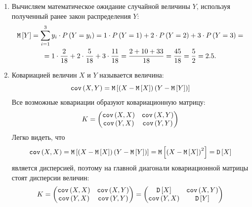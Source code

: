 \begin{enumerate}
    \item Вычисляем математическое ожидание случайной величины $Y$, используя полученный ранее закон распределения $Y$:
    \begin{multline}
        \mathtt{M} \left [ Y \right ] = \sum_{i=1}^3 y_i \cdot P \left ( Y=y_i \right )
        = 1 \cdot P \left ( Y=1 \right ) + 2 \cdot P \left ( Y=2 \right ) + 3 \cdot P \left ( Y=3 \right ) = \\
        = 1 \cdot \frac{2}{18} + 2 \cdot \frac{5}{18} + 3 \cdot \frac{11}{18}
        = \frac{2 + 10 + 33}{18} = \frac{45}{18} = \frac{5}{2} = 2.5
        .
    \end{multline}

    \item Ковариацией величин $X$ и $Y$ называется величина:
    \begin{equation}
        \texttt{cov} \left ( X , Y \right ) = \mathtt{M} \left [ \left ( X - \mathtt{M} \left [ X \right ] \right ) \left ( Y - \mathtt{M} \left [ Y \right ] \right ) \right ]
    \end{equation}
    Все возможные ковариации образуют ковариационную матрицу:
    \begin{equation}
        K =
        \begin{pmatrix}
            \texttt{cov} \left ( X , X \right ) & \texttt{cov} \left ( X , Y \right ) \\
            \texttt{cov} \left ( Y , X \right ) & \texttt{cov} \left ( Y , Y \right )
        \end{pmatrix}
    \end{equation}
    Легко видеть, что
    \begin{equation}
        \texttt{cov} \left ( X , X \right )
        = \mathtt{M} \left [ \left ( X - \mathtt{M} \left [ X \right ] \right ) \left ( Y - \mathtt{M} \left [ Y \right ] \right ) \right ]
        = \mathtt{M} \left [ \left ( X - \mathtt{M} \left [ X \right ] \right )^2 \right ]
        = \mathtt{D} \left [ X \right ]
    \end{equation}
    является дисперсией, поэтому на главной диагонали ковариационной матрицы стоят дисперсии величин:
    \begin{equation}
        K =
        \begin{pmatrix}
            \texttt{cov} \left ( X , X \right ) & \texttt{cov} \left ( X , Y \right ) \\
            \texttt{cov} \left ( Y , X \right ) & \texttt{cov} \left ( Y , Y \right )
        \end{pmatrix}
        =
        \begin{pmatrix}
            \mathtt{D} \left [ X \right ]      & \texttt{cov} \left ( X , Y \right ) \\
            \texttt{cov} \left ( Y , X \right ) & \mathtt{D} \left [ Y \right ]
        \end{pmatrix}
    \end{equation}


\end{enumerate}
